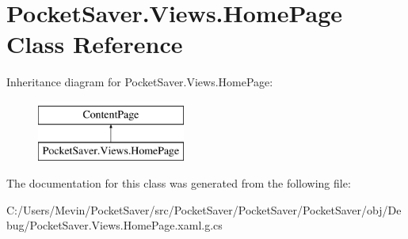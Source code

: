 \hypertarget{class_pocket_saver_1_1_views_1_1_home_page}{}\section{Pocket\+Saver.\+Views.\+Home\+Page Class Reference}
\label{class_pocket_saver_1_1_views_1_1_home_page}
Inheritance diagram for Pocket\+Saver.\+Views.\+Home\+Page\+:\begin{figure}[H]
\begin{center}
\leavevmode
\includegraphics[height=2.000000cm]{class_pocket_saver_1_1_views_1_1_home_page}
\end{center}
\end{figure}


The documentation for this class was generated from the following file\+:\begin{DoxyCompactItemize}
\item 
C\+:/\+Users/\+Mevin/\+Pocket\+Saver/src/\+Pocket\+Saver/\+Pocket\+Saver/\+Pocket\+Saver/obj/\+Debug/Pocket\+Saver.\+Views.\+Home\+Page.\+xaml.\+g.\+cs\end{DoxyCompactItemize}
